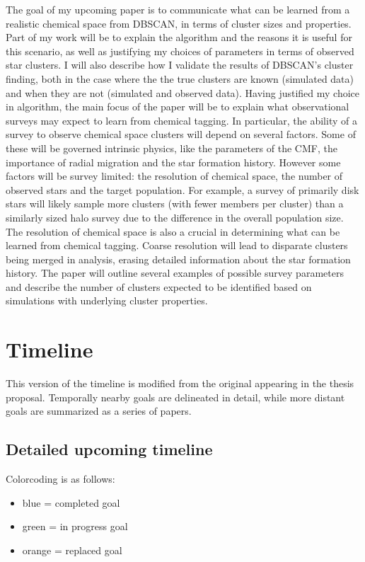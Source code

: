 \documentclass[11pt]{article}
\begin{document}
The goal of my upcoming paper is to communicate what can be learned from a realistic chemical space from DBSCAN, in terms of cluster sizes and properties. Part of my work will be to explain the algorithm and the reasons it is useful for this scenario, as well as justifying my choices of parameters in terms of observed star clusters. I will also describe how I validate the results of DBSCAN's cluster finding, both in the case where the the true clusters are known (simulated data) and when they are not (simulated and observed data). Having justified my choice in algorithm, the main focus of the paper will be to explain what observational surveys may expect to learn from chemical tagging. In particular, the ability of a survey to observe chemical space clusters will depend on several factors. Some of these will be governed intrinsic physics, like the parameters of the CMF, the importance of radial migration and the star formation history. However some factors will be survey limited: the resolution of chemical space, the number of observed stars and the target population. For example, a survey of primarily disk stars will likely sample more clusters (with fewer members per cluster) than a similarly sized halo survey due to the difference in the overall population size. The resolution of chemical space is also a crucial in determining what can be learned from chemical tagging. Coarse resolution will lead to disparate clusters being merged in analysis, erasing detailed information about the star formation history. The paper will outline several examples of possible survey parameters and describe the number of clusters expected to be identified based on simulations with underlying cluster properties.

\section*{Timeline}

This version of the timeline is modified from the original appearing in the thesis proposal. Temporally nearby goals are delineated in detail, while more distant goals are summarized as a series of papers. 

\subsection*{Detailed upcoming timeline}
Colorcoding is as follows:
    
    \begin{itemize}
    	\item {\color{RoyalBlue}blue} = completed goal
    	\item {\color{ForestGreen} green} = in progress goal
    	\item {\color{BurntOrange} orange} = replaced goal
    \end{itemize}
\end{document}
